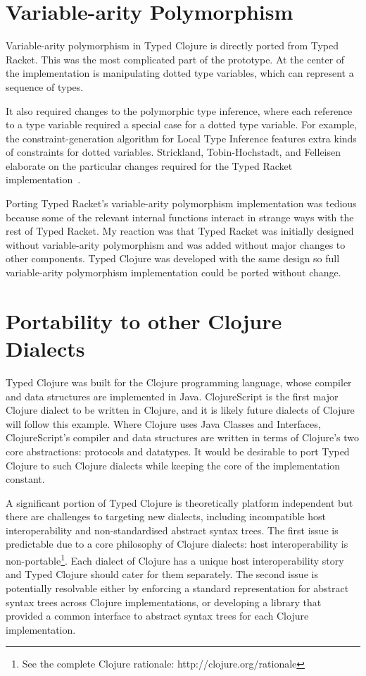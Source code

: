 \section{Variable-arity Polymorphism}
\label{sec:impvariablearity}

Variable-arity polymorphism in Typed Clojure is directly ported from Typed Racket.
This was the most complicated part of the prototype. At the center of the implementation
is manipulating dotted type variables, which can represent a sequence of types.

It also required changes to the polymorphic type inference, where each
reference to a type variable required a special case for a dotted type variable.
For example, the constraint-generation algorithm for Local Type Inference
features extra kinds of constraints for dotted variables.
Strickland, Tobin-Hochstadt, and Felleisen elaborate on the particular changes
required for the Typed Racket implementation~\cite{STF09}.

Porting Typed Racket's variable-arity polymorphism implementation was
tedious because some of the relevant internal functions interact
in strange ways with the rest of Typed Racket. My reaction was that Typed Racket
was initially designed without variable-arity polymorphism and was added
without major changes to other components. Typed Clojure was
developed with the same design so full variable-arity polymorphism
implementation could be ported without change.

\section{Portability to other Clojure Dialects}
\label{sec:portability}

Typed Clojure was built for the Clojure programming language, whose compiler
and data structures are implemented in Java. ClojureScript is the first major Clojure dialect
to be written in Clojure, and it is likely future dialects of Clojure will follow this example. 
Where Clojure uses Java Classes and Interfaces, 
ClojureScript's compiler and data structures are written in terms of Clojure's
two core abstractions: protocols and datatypes.
It would be desirable to port Typed Clojure to such Clojure dialects while keeping
the core of the implementation constant.

A significant portion of Typed Clojure is theoretically platform independent but there are
challenges to targeting new dialects, including incompatible host interoperability and
non-standardised abstract syntax trees.
The first issue is predictable due to a core philosophy of Clojure dialects: 
host interoperability is non-portable\footnote{See the complete Clojure rationale: http://clojure.org/rationale}.
Each dialect of Clojure has a unique host interoperability story and Typed Clojure should cater for them
separately.
The second issue is potentially resolvable either by enforcing a standard representation for 
abstract syntax trees across Clojure implementations, or developing a library that provided
a common interface to abstract syntax trees for each Clojure implementation.

